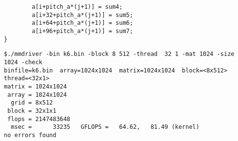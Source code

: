 \documentclass[11pt]{article}
\begin{document}
\begin{enumerate}
\begin{lstlisting}
        a[i+pitch_a*(j+1)] = sum4;
        a[i+32+pitch_a*(j+1)] = sum5;
        a[i+64+pitch_a*(j+1)] = sum6;
        a[i+96+pitch_a*(j+1)] = sum7;
}
\end{lstlisting}

\begin{lstlisting}
$./mmdriver -bin k6.bin -block 8 512 -thread  32 1 -mat 1024 -size 1024 -check
binfile=k6.bin  array=1024x1024  matrix=1024x1024  block=<8x512>  thread=<32x1>
matrix = 1024x1024
 array = 1024x1024
  grid = 8x512
 block = 32x1x1
 flops = 2147483648
  msec =      33235   GFLOPS =   64.62,   81.49 (kernel)
no errors found

\end{lstlisting}


\end{enumerate}
\end{document}
